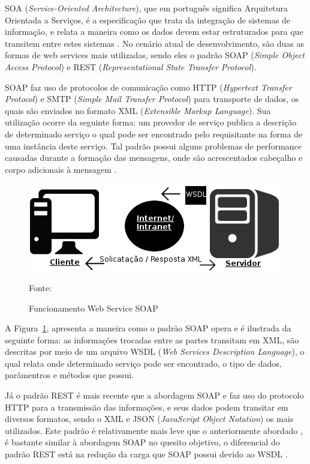 SOA (\textit{Service-Oriented Architecture}), que em português significa Arquitetura Orientada a Serviços, é a especificação que trata da integração de sistemas de informação, e relata a maneira como os dados devem estar estruturados para que transitem entre estes sistemas \cite{eulalio2016webservices}. No cenário atual de desenvolvimento, são duas as formas de web services mais utilizadas, sendo eles o padrão SOAP (\textit{Simple Object Access Protocol}) e REST (\textit{Representational State Transfer Protocol}). 

SOAP faz uso de protocolos de comunicação como HTTP (\textit{Hypertext Transfer Protocol}) e SMTP (\textit{Simple Mail Transfer Protocol}) para transporte de dados, os quais são enviados no formato XML (\textit{Extensible Markup Language}). Sua utilização ocorre da seguinte forma: um provedor de serviço publica a descrição de determinado serviço o qual pode ser encontrado pelo requisitante na forma de uma instância deste serviço. Tal padrão possui alguns problemas de performance causadas durante a formação das mensagens, onde são acrescentados cabeçalho e corpo adicionais à mensagem \cite{tihomirovs2016webservices}.

\begin{figure}[H]
    \centering
    \includegraphics{imagens/soap.png}
    \caption{Funcionamento Web Service SOAP}
    Fonte: \cite{eulalio2016webservices}
    \label{fig: SOAP}
\end{figure}

A Figura~\ref{fig: SOAP}, apresenta a maneira como o padrão SOAP opera e é ilustrada da seguinte forma: as informações trocadas entre as partes transitam em XML, são descritas por meio de um arquivo WSDL (\textit{Web Services Description Language}), o qual relata onde determinado serviço pode ser encontrado, o tipo de dados, parâmentros e métodos que possui.


Já o padrão REST é mais recente que a abordagem SOAP e faz uso do protocolo HTTP para a transmissão das informações, e seus dados podem transitar em diversos formatos, sendo o XML e JSON (\textit{JavaScript Object Notation}) os mais utilizados. Este padrão é relativamente mais leve que o anteriormente abordado \cite{tihomirovs2016webservices}, é bastante similar à abordagem SOAP no quesito objetivo, o diferencial do padrão REST está na redução da carga que SOAP possui devido ao WSDL \cite{eulalio2016webservices}.

